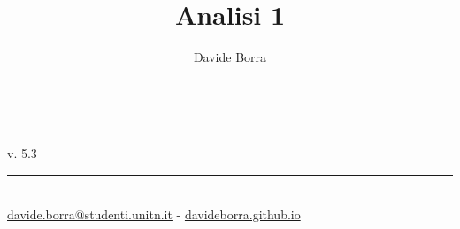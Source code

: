 \documentclass{book}     %
\title{Analisi 1}
\author{Davide Borra}
\date{}
\makeatletter
\let\runauthor\@author
\let\runtitle\@title
\makeatother
\begin{document}
\lhead{}
\chead{}
\rfoot{\runauthor}

\begin{titlepage}
    \pagestyle{empty}
    \begin{center}
        \vspace*{\fill}
        \vspace{0.5cm}
        \textbf{\Huge \runtitle}\\\vspace{5mm}
        \textsc{\Large \runauthor}
        \vspace{5cm}
    \end{center}
    \vspace*{\fill}
    v. 5.3\\
    \rule{0.8\linewidth}{0.5mm}\\
    {\footnotesize\href{mailto:davide.borra@studenti.unitn.it}{davide.borra@studenti.unitn.it} - \href{http://davideborra.github.io}{davideborra.github.io}}
    \restoregeometry
\end{titlepage}
\thispagestyle{empty}
\frontmatter
    \tableofcontents
    \creativecommons
\mainmatter
\lhead{\runtitle}
\chead{}
\rhead{\leftmark\ - \rightmark}
\rfoot{\runauthor}








\end{document}
